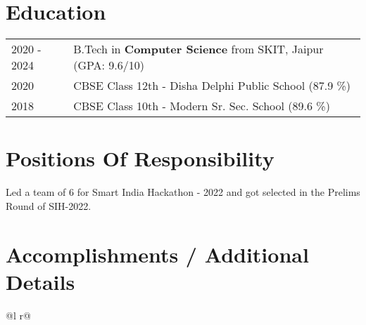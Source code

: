 \documentclass[a4paper,12pt]{article}
\begin{document}
\section{Education}
\begin{tabularx}{\linewidth}{@{}l X@{}}
2020 - 2024 & B.Tech in \textbf{Computer Science} from SKIT, Jaipur \hfill (GPA: 9.6/10) \\ 

2020 & CBSE Class 12th - Disha Delphi Public School \hfill  (87.9 \%) \\

2018 & CBSE Class 10th - Modern Sr. Sec. School \hfill  (89.6 \%) \\
\end{tabularx}



\section{Positions Of Responsibility}
Led a team of 6 for Smart India Hackathon - 2022 and got selected in the Prelims Round of
SIH-2022.

\section{Accomplishments / Additional Details}
\begin{tabularx}{\linewidth}{ @{}l r@{} }
\end{tabularx}
\end{document}

